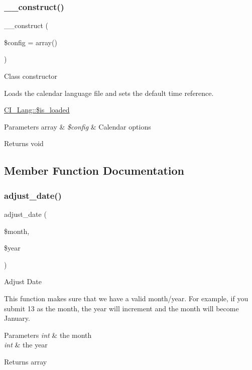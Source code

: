 \subsubsection{\texorpdfstring{\+\_\+\+\_\+construct()}{\_\_construct()}}
{\footnotesize\ttfamily \+\_\+\+\_\+construct (\begin{DoxyParamCaption}\item[{}]{\$config = {\ttfamily array()} }\end{DoxyParamCaption})}

Class constructor

Loads the calendar language file and sets the default time reference.

\mbox{\hyperlink{class_c_i___lang_a908e9ad52a5d1956d360689452f6bdbe}{C\+I\+\_\+\+Lang\+::\$is\+\_\+loaded}}


\begin{DoxyParams}[1]{Parameters}
array & {\em \$config} & Calendar options \\
\hline
\end{DoxyParams}
\begin{DoxyReturn}{Returns}
void 
\end{DoxyReturn}


\subsection{Member Function Documentation}
\mbox{\label{class_c_i___calendar_ac216356ab0ff31e8538fd9208a26577a}} 
\subsubsection{\texorpdfstring{adjust\+\_\+date()}{adjust\_date()}}
{\footnotesize\ttfamily adjust\+\_\+date (\begin{DoxyParamCaption}\item[{}]{\$month,  }\item[{}]{\$year }\end{DoxyParamCaption})}

Adjust Date

This function makes sure that we have a valid month/year. For example, if you submit 13 as the month, the year will increment and the month will become January.


\begin{DoxyParams}{Parameters}
{\em int} & the month \\
\hline
{\em int} & the year \\
\hline
\end{DoxyParams}
\begin{DoxyReturn}{Returns}
array 
\end{DoxyReturn}
\mbox{\label{class_c_i___calendar_a5d174710ed7a2a08df21dbaa2bb6a50f}} 
